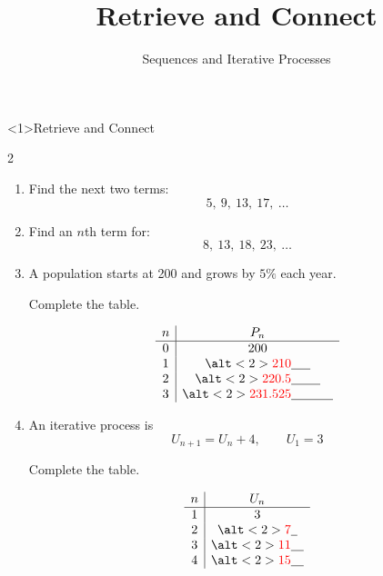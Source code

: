 \documentclass{beamer}
\title{Retrieve and Connect}
\subtitle{Sequences and Iterative Processes}
\newcommand{\ablank}[1]{%
  \alt<2>{\textcolor{red}{#1}}{\underline{\phantom{#1}}}%
}
\newcommand{\ashow}[1]{\uncover<2->{\textcolor{red}{\small #1}}}
\begin{document}
\begin{frame}<1>{Retrieve and Connect}

\small

\begin{multicols}{2}

\begin{enumerate}

\item Find the next two terms:
\[
5,\ 9,\ 13,\ 17,\ \dots
\]

\ashow{$21,\ 25$}

\vspace{0.4cm}

\item Find an $n$th term for:
\[
8,\ 13,\ 18,\ 23,\ \dots
\]

\ashow{$5n+3$}

\vspace{0.4cm}

\item A population starts at 200 and grows by $5\%$ each year.

Complete the table.

\[
\begin{array}{c|c}
n & P_n \\
\hline
0 & 200 \\
1 & \ablank{210} \\
2 & \ablank{220.5} \\
3 & \ablank{231.525}
\end{array}
\]

\vspace{0.2cm}


\vspace{0.4cm}

\item An iterative process is
\[
U_{n+1} = U_n + 4, \qquad U_1 = 3
\]

Complete the table.

\[
\begin{array}{c|c}
n & U_n \\
\hline
1 & 3 \\
2 & \ablank{7} \\
3 & \ablank{11} \\
4 & \ablank{15}
\end{array}
\]

\end{enumerate}

\end{multicols}

\end{frame}
\end{document}
